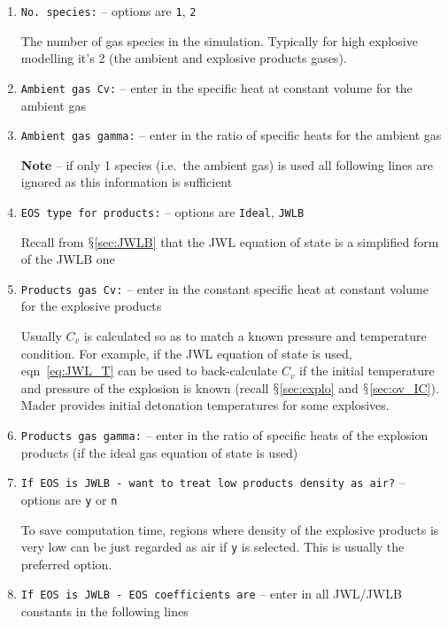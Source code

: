 \documentclass[pdftex, 12pt, a4paper]{report}
\begin{document}
\begin{enumerate}
  \item \verb'No. species:' -- options are \verb'1', \verb'2'

    The number of gas species in the simulation.  Typically for high explosive modelling it's 2 (the ambient and explosive products
    gases).

  \item \verb'Ambient gas Cv:' -- enter in the specific heat at constant volume for the ambient gas

  \item \verb'Ambient gas gamma:' -- enter in the ratio of specific heats for the ambient gas

  \textbf{Note} -- if only 1 species (i.e.\ the ambient gas) is used all following lines are ignored as this information is sufficient

  \item \verb'EOS type for products:' -- options are \verb'Ideal', \verb'JWLB'

    Recall from $\mathsection$\ref{sec:JWLB} that the JWL equation of state is a simplified form of the JWLB one 

  \item \verb'Products gas Cv:' -- enter in the constant specific heat at constant volume for the explosive products

    Usually $C_v$ is calculated so as to match a known pressure and temperature condition.  For example, if the
    JWL equation of state is used, eqn~\ref{eq:JWL_T}
    can be used to back-calculate $C_v$ if the initial temperature and pressure of the explosion is known (recall 
    $\mathsection$\ref{sec:explo} and $\mathsection$\ref{sec:ov_IC}).  Mader \cite{Mader:book} provides initial detonation
    temperatures for some explosives.

  \item \verb'Products gas gamma:' -- enter in the ratio of specific heats of the explosion products (if the ideal gas equation
    of state is used)

  \item \verb'If EOS is JWLB - want to treat low products density as air?' -- options are \verb'y' or \verb'n'

    To save computation time, regions where density of the explosive products is very low can be just regarded as air if \verb'y' is
    selected.  This is usually the preferred option.

  \item \verb'If EOS is JWLB - EOS coefficients are' -- enter in all JWL/JWLB constants in the following lines


\end{enumerate}
\end{document}

